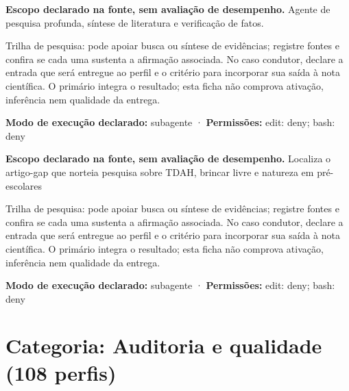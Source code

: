 \begin{descricao}
\textbf{Escopo declarado na fonte, sem avaliação de desempenho.}
Agente de pesquisa profunda, síntese de literatura e verificação de fatos.
\end{descricao}

\begin{funcao}
Trilha de pesquisa: pode apoiar busca ou síntese de evidências; registre fontes e confira se cada uma sustenta a afirmação associada. No caso condutor, declare a entrada que será entregue ao perfil e o critério para incorporar sua saída à nota científica. O primário integra o resultado; esta ficha não comprova ativação, inferência nem qualidade da entrega.
\end{funcao}

\begin{arquitetura}
\textbf{Modo de execução declarado:} subagente · \textbf{Permissões:} edit: deny; bash: deny
\end{arquitetura}


\begin{descricao}
\textbf{Escopo declarado na fonte, sem avaliação de desempenho.}
Localiza o artigo-gap que norteia pesquisa sobre TDAH, brincar livre e natureza em pré-escolares
\end{descricao}

\begin{funcao}
Trilha de pesquisa: pode apoiar busca ou síntese de evidências; registre fontes e confira se cada uma sustenta a afirmação associada. No caso condutor, declare a entrada que será entregue ao perfil e o critério para incorporar sua saída à nota científica. O primário integra o resultado; esta ficha não comprova ativação, inferência nem qualidade da entrega.
\end{funcao}

\begin{arquitetura}
\textbf{Modo de execução declarado:} subagente · \textbf{Permissões:} edit: deny; bash: deny
\end{arquitetura}

\clearpage
\section{Categoria: Auditoria e qualidade (108 perfis)}

